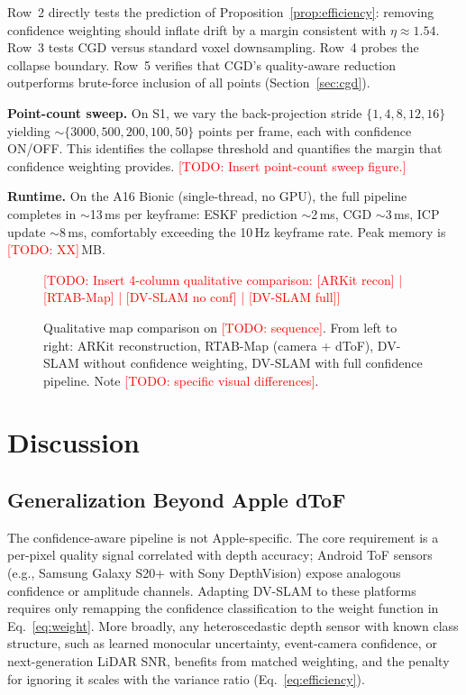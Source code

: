 \documentclass[journal]{IEEEtran}
\newcommand{\todo}[1]{\textcolor{red}{[TODO: #1]}}
\begin{document}
Row~2 directly tests the prediction of Proposition~\ref{prop:efficiency}: removing confidence weighting should inflate drift by a margin consistent with $\eta \approx 1.54$. Row~3 tests CGD versus standard voxel downsampling. Row~4 probes the collapse boundary. Row~5 verifies that CGD's quality-aware reduction outperforms brute-force inclusion of all points (Section~\ref{sec:cgd}).

\textbf{Point-count sweep.} On S1, we vary the back-projection stride $\{1, 4, 8, 12, 16\}$ yielding ${\sim}\{3000, 500, 200, 100, 50\}$ points per frame, each with confidence ON/OFF. This identifies the collapse threshold and quantifies the margin that confidence weighting provides. \todo{Insert point-count sweep figure.}

\textbf{Runtime.} On the A16 Bionic (single-thread, no GPU), the full pipeline completes in ${\sim}$13\,ms per keyframe: ESKF prediction ${\sim}$2\,ms, CGD ${\sim}$3\,ms, ICP update ${\sim}$8\,ms, comfortably exceeding the 10\,Hz keyframe rate. Peak memory is \todo{XX}\,MB.

\begin{figure}[t]
    \centering
    \todo{Insert 4-column qualitative comparison: [ARKit recon] | [RTAB-Map] | [DV-SLAM no conf] | [DV-SLAM full]}
    \caption{Qualitative map comparison on \todo{sequence}. From left to right: ARKit reconstruction, RTAB-Map (camera + dToF), DV-SLAM without confidence weighting, DV-SLAM with full confidence pipeline. Note \todo{specific visual differences}.}
    \label{fig:qualitative}
\end{figure}

\section{Discussion}
\label{sec:discussion}

\subsection{Generalization Beyond Apple dToF}

The confidence-aware pipeline is not Apple-specific. The core requirement is a per-pixel quality signal correlated with depth accuracy; Android ToF sensors (e.g., Samsung Galaxy S20+ with Sony DepthVision) expose analogous confidence or amplitude channels. Adapting DV-SLAM to these platforms requires only remapping the confidence classification to the weight function in Eq.~\eqref{eq:weight}. More broadly, any heteroscedastic depth sensor with known class structure, such as learned monocular uncertainty, event-camera confidence, or next-generation LiDAR SNR, benefits from matched weighting, and the penalty for ignoring it scales with the variance ratio (Eq.~\eqref{eq:efficiency}).
\end{document}
